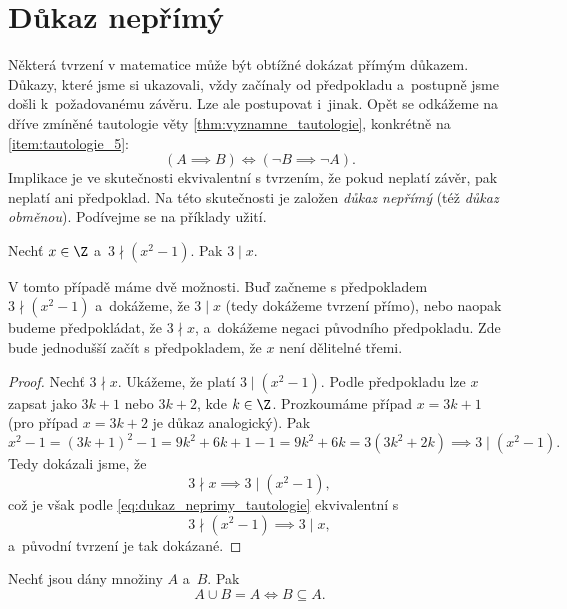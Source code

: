 \section{Důkaz nepřímý}\label{sec:dukaz_neprimy}
Některá tvrzení v matematice může být obtížné dokázat přímým důkazem. Důkazy, které jsme si ukazovali, vždy začínaly od předpokladu a~postupně jsme došli k~požadovanému závěru. Lze ale postupovat i~jinak. Opět se odkážeme na dříve zmíněné tautologie věty \ref{thm:vyznamne_tautologie}, konkrétně na \ref{item:tautologie_5}:
\begin{equation}\label{eq:dukaz_neprimy_tautologie}
    (A \implies B) \iff (\neg B \implies \neg A).
\end{equation}
Implikace je ve skutečnosti ekvivalentní s tvrzením, že pokud neplatí závěr, pak neplatí ani předpoklad. Na této skutečnosti je založen \emph{důkaz nepřímý} (též \emph{důkaz obměnou}). Podívejme se na příklady užití.
\begin{proposition}
    Nechť $x\in\Z$ a~$3 \nmid (x^2-1)$. Pak $3 \mid x$.
\end{proposition}
V tomto případě máme dvě možnosti. Buď začneme s předpokladem $3 \nmid (x^2-1)$ a~dokážeme, že $3 \mid x$ (tedy dokážeme tvrzení přímo), nebo naopak budeme předpokládat, že $3 \nmid x$, a~dokážeme negaci původního předpokladu. Zde bude jednodušší začít s předpokladem, že $x$ není dělitelné třemi.
\begin{proof}
    Nechť $3 \nmid x$. Ukážeme, že platí $3 \mid (x^2-1)$. Podle předpokladu lze $x$ zapsat jako $3k+1$ nebo $3k+2$, kde $k\in\Z$. Prozkoumáme případ $x=3k+1$ (pro případ $x=3k+2$ je důkaz analogický). Pak
    \begin{equation*}
        x^2-1=(3k+1)^2-1=9k^2+6k+1-1=9k^2+6k=3(3k^2+2k)\implies 3 \mid (x^2-1).
    \end{equation*}
    Tedy dokázali jsme, že
    \begin{equation*}
        3 \nmid x \implies 3 \mid (x^2-1),
    \end{equation*}
    což je však podle \ref{eq:dukaz_neprimy_tautologie} ekvivalentní s
    \begin{equation*}
        3 \nmid (x^2-1) \implies 3 \mid x,
    \end{equation*}
    a~původní tvrzení je tak dokázané.
\end{proof}
\begin{proposition}
    Nechť jsou dány množiny $A$ a~$B$. Pak
    \begin{equation*}
        A \cup B=A \iff B \subseteq A.
    \end{equation*}
\end{proposition}
